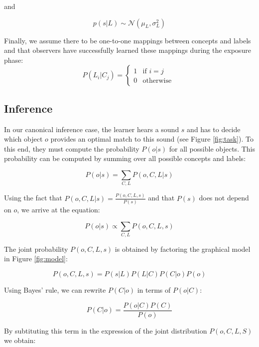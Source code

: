 \documentclass[english,,man]{apa6}
\begin{document}
\begin{center}
and 
\end{center}

\begin{equation} \label{eq:sound}
p(s| L) \sim  \mathcal{N}(\mu_L, \sigma^2_L)
\end{equation}

Finally, we assume there to be one-to-one mappings between concepts and labels and that observers have successfully learned these mappings during the exposure phase:
\begin{equation}\label{eq:mapping}
P(L_i|C_j) = 
\begin{cases}
  1 & \text{if  }  i=j \\  
  0  & \text{otherwise  }
\end{cases}
\end{equation}

\hypertarget{inference}{%
\subsection{Inference}\label{inference}}

In our canonical inference case, the learner hears a sound \(s\) and has to decide which object \(o\) provides an optimal match to this sound (see Figure \ref{fig:task}). To this end, they must compute the probability \(P(o|s)\) for all possible objects. This probability can be computed by summing over all possible concepts and labels:

\begin{equation}
P(o|s)=\sum_{C,L} P(o, C, L| s)  
\end{equation}

Using the fact that \(P(o,C,L|s) = \frac{P(o,C,L,s)}{P(s)}\) and that \(P(s)\) does not depend on \(o\), we arrive at the equation:

\begin{equation}
P(o|s) \propto \sum_{C,L} P(o, C, L, s) 
\end{equation}

The joint probability \(P(o,C,L,s)\) is obtained by factoring the graphical model in Figure \ref{fig:model}:

\[P(o,C,L,s) = P(s|L)P(L|C)P(C|o)P(o)\]

Using Bayes' rule, we can rewrite \(P(C|o)\) in terms of \(P(o|C)\):

\[P(C|o) = \frac{P(o|C)P(C)}{P(o)}\]

By subtituting this term in the expression of the joint distribution \(P(o,C,L,S)\) we obtain:
\end{document}

